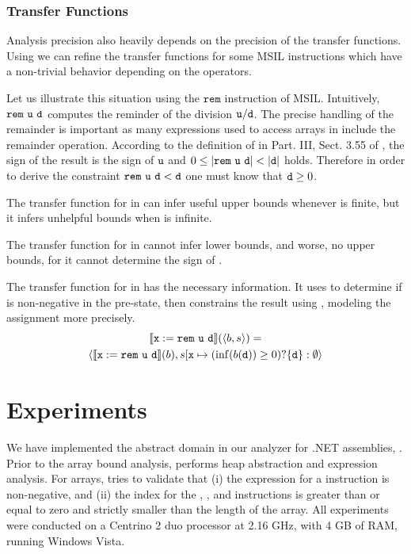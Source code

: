 \documentclass{sig-alternate}
\begin{document}
\subsubsection*{Transfer Functions}
Analysis precision also heavily depends on the precision of the transfer functions.
Using \Pentagons{} we can refine the transfer functions for some MSIL instructions  which have a non-trivial behavior depending on the operators.

Let us illustrate this situation using the $\mathtt{rem}$ instruction of MSIL.
Intuitively, $\mathtt{rem}\ \mathtt{u\ d} $ computes the reminder of the division $\mathtt{u / d}$.
The precise handling of the remainder is important as many expressions
used to access arrays in  include the remainder operation.
According to the definition of  in Part. III, Sect. 3.55 of
\cite{ECMA-CLI}, the sign of the result is the sign of $\mathtt{u}$ and
$0 \leq | \mathtt{rem \ u \ d} | < | \mathtt{d} |$ holds. 
Therefore in order to derive the constraint $\mathtt{rem \ u \ d} < \mathtt{d}$ one
must know that $\mathtt{d} \geq 0$.  

The transfer function for  in \Intervals{} can infer useful
upper bounds whenever  is finite, but it infers unhelpful
bounds when  is infinite.

The transfer function for  in \SUB{} cannot infer lower
bounds, and worse, no upper bounds, for it cannot
determine the sign of .

The transfer function for  in \Pentagons{} has the necessary
information. It uses \Intervals{} to determine if  is
non-negative in the pre-state,
then constrains the result using \SUB{}, modeling the assignment more precisely.
\begin{multline*}
\mathbb{}\llbracket \mathtt{x := rem\ u\ d} \rrbracket(\langle b, s \rangle) = \\ 
\langle \mathbb{}\llbracket \mathtt{x := rem\ u\ d} \rrbracket(b), s[\mathtt{x} \mapsto (\mathrm{inf}(b(\mathtt{d})) \geq 0) ? \{ \mathtt{d} \}: \emptyset   \rangle
\end{multline*}

\section{Experiments}\label{sec:experiments}
We have implemented the abstract domain \Pentagons{} in our analyzer
for .NET assemblies, \Clousot. Prior to the array bound analysis,
\Clousot{} performs heap abstraction and expression analysis.
For arrays, \Clousot{} tries to validate that (i) the expression for a
 instruction is non-negative, and (ii) the
index for the 
, , and  instructions is greater than or
equal to zero and strictly smaller than the length of the array.
All experiments were conducted on a Centrino 2 duo processor at 2.16
GHz, with 4 GB of RAM, running Windows Vista. 
\end{document}
